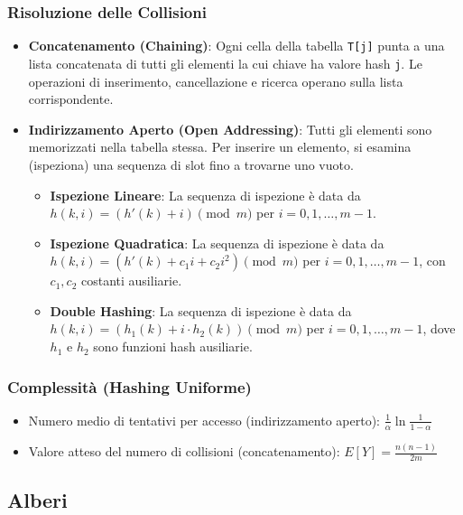 \subsubsection{Risoluzione delle Collisioni}
\begin{itemize}
    \item \textbf{Concatenamento (Chaining)}: Ogni cella della tabella \texttt{T[j]} punta a una lista concatenata di tutti gli elementi la cui chiave ha valore hash \texttt{j}. Le operazioni di inserimento, cancellazione e ricerca operano sulla lista corrispondente.
    \item \textbf{Indirizzamento Aperto (Open Addressing)}: Tutti gli elementi sono memorizzati nella tabella stessa. Per inserire un elemento, si esamina (ispeziona) una sequenza di slot fino a trovarne uno vuoto.
    \begin{itemize}
        \item \textbf{Ispezione Lineare}: La sequenza di ispezione è data da $h(k, i) = (h'(k) + i) \pmod{m}$ per $i = 0, 1, \dots, m-1$.
        \item \textbf{Ispezione Quadratica}: La sequenza di ispezione è data da $h(k, i) = (h'(k) + c_1i + c_2i^2) \pmod{m}$ per $i = 0, 1, \dots, m-1$, con $c_1, c_2$ costanti ausiliarie.
        \item \textbf{Double Hashing}: La sequenza di ispezione è data da $h(k, i) = (h_1(k) + i \cdot h_2(k)) \pmod{m}$ per $i = 0, 1, \dots, m-1$, dove $h_1$ e $h_2$ sono funzioni hash ausiliarie.
    \end{itemize}
\end{itemize}

\subsubsection{Complessità (Hashing Uniforme)}
\begin{itemize}
    \item Numero medio di tentativi per accesso (indirizzamento aperto): $\frac{1}{\alpha} \ln\frac{1}{1-\alpha}$
    \item Valore atteso del numero di collisioni (concatenamento): $E[Y] = \frac{n(n-1)}{2m}$
\end{itemize}

\subsection{Alberi}

